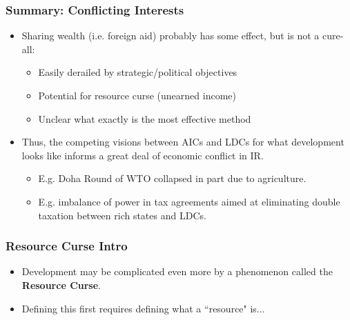 \documentclass{beamer}
\begin{document}
\begin{frame} 
	\frametitle{\LARGE{Summary: Conflicting Interests}}
	\begin{itemize}
		\item Sharing wealth (i.e. foreign aid) probably has some effect, but is not a cure-all: \pause 
		\begin{itemize}
			\item Easily derailed by strategic/political objectives \pause 
			\item Potential for resource curse (unearned income)\pause 
			\item Unclear what exactly is the most effective method \pause 
		\end{itemize}
		\item Thus, the competing visions between AICs and LDCs for what development looks like informs a great deal of economic conflict in IR. \pause 
		\begin{itemize}
			\item E.g. Doha Round of WTO collapsed in part due to agriculture. \pause 
			\item E.g. imbalance of power in tax agreements aimed at eliminating double taxation between rich states and LDCs.
		\end{itemize}
	\end{itemize}
\end{frame}

\begin{frame} 
	\frametitle{\LARGE{Resource Curse Intro}}
	\begin{itemize}
		\item Development may be complicated even more by a phenomenon called the \textbf{Resource Curse}.
		\item Defining this first requires defining what a ``resource" is...
		
	\end{itemize}
\end{frame}
\end{document}
